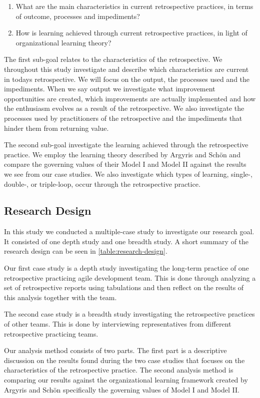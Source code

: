 \documentclass[lnbip]{svmultln}
\begin{document}
\begin{enumerate}
	\item What are the main characteristics in current retrospective practices, in terms of outcome, processes and impediments?
	\item How is learning achieved through current retrospective practices, in light of organizational learning theory?
\end{enumerate}

The first sub-goal relates to the characteristics of the retrospective. We throughout this study investigate and describe which characteristics are current in todays retrospective. We will focus on the output, the processes used and the impediments. When we say output we investigate what improvement opportunities are created, which improvements are actually implemented and how the enthusiasm evolves as a result of the retrospective. We also investigate the processes used by practitioners of the retrospective and the impediments that hinder them from returning value.

The second sub-goal investigate the learning achieved through the retrospective practice. We employ the learning theory described by Argyris and Schön \cite{Argyris1996} and compare the governing values of their Model I and Model II against the results we see from our case studies. We also investigate which types of learning, single-, double-, or triple-loop, occur through the retrospective practice.

\subsection{Research Design}
In this study we conducted a multiple-case study to investigate our research goal. It consisted of one depth study and one breadth study. A short summary of the research design can be seen in \autoref{table:research-design}.

Our first case study is a depth study investigating the long-term practice of one retrospective practicing agile development team. This is done through analyzing a set of retrospective reports using tabulations and then reflect on the results of this analysis together with the team.

The second case study is a breadth study investigating the retrospective practices of other teams. This is done by interviewing representatives from different retrospective practicing teams.

Our analysis method consists of two parts. The first part is a descriptive discussion on the results found during the two case studies that focuses on the characteristics of the retrospective practice. The second analysis method is comparing our results against the organizational learning framework created by Argyris and Schön \cite{Argyris1996} specifically the governing values of Model I and Model II.
\end{document}
